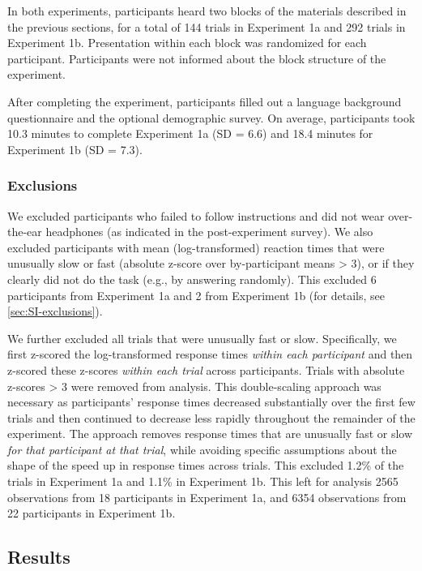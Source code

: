 \documentclass[preprint]{JASA}
\begin{document}
In both experiments, participants heard two blocks of the materials described in the previous sections, for a total of 144 trials in Experiment 1a and 292 trials in Experiment 1b. Presentation within each block was randomized for each participant. Participants were not informed about the block structure of the experiment.

After completing the experiment, participants filled out a language background questionnaire and the optional demographic survey. On average, participants took 10.3 minutes to complete Experiment 1a (SD = 6.6) and 18.4 minutes for Experiment 1b (SD = 7.3).

\subsubsection{Exclusions}\label{exclusions}

We excluded participants who failed to follow instructions and did not wear over-the-ear headphones (as indicated in the post-experiment survey). We also excluded participants with mean (log-transformed) reaction times that were unusually slow or fast (absolute z-score over by-participant means \textgreater{} 3), or if they clearly did not do the task (e.g., by answering randomly). This excluded 6 participants from Experiment 1a and 2 from Experiment 1b (for details, see \ref{sec:SI-exclusions}).

We further excluded all trials that were unusually fast or slow. Specifically, we first z-scored the log-transformed response times \emph{within each participant} and then z-scored these z-scores \emph{within each trial} across participants. Trials with absolute z-scores \textgreater{} 3 were removed from analysis. This double-scaling approach was necessary as participants' response times decreased substantially over the first few trials and then continued to decrease less rapidly throughout the remainder of the experiment. The approach removes response times that are unusually fast or slow \emph{for that participant at that trial}, while avoiding specific assumptions about the shape of the speed up in response times across trials. This excluded 1.2\% of the trials in Experiment 1a and 1.1\% in Experiment 1b. This left for analysis 2565 observations from 18 participants in Experiment 1a, and 6354 observations from 22 participants in Experiment 1b.

\subsection{Results}\label{sec:experiment-results}
\end{document}
